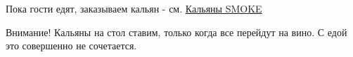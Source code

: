\documentclass[t]{beamer}
\begin{document}
\begin{frame}
    Пока гости едят, заказываем кальян - см. \href{https://getsmoke.ru/}{\underline{Кальяны SMOKE}} \\
    \begin{block}{Внимание!}
        Кальяны на стол ставим, только когда все перейдут на вино. С едой это совершенно не сочетается.
    \end{block}
\end{frame}
\end{document}
